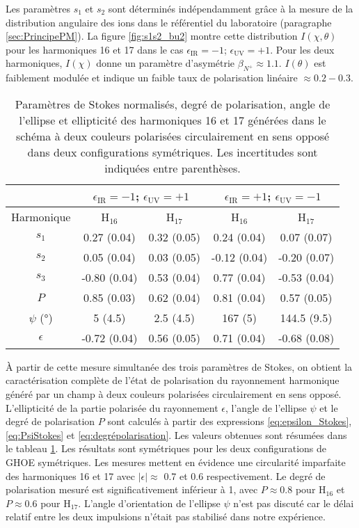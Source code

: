 Les paramètres $s_1$ et $s_2$ sont déterminés indépendamment grâce à la mesure de la distribution angulaire des ions dans le référentiel du laboratoire (paragraphe \ref{sec:PrincipePM}). La figure \ref{fig:s1s2_bu2} montre cette distribution $I(\chi, \theta)$ pour les harmoniques 16 et 17 dans le cas $\epsilon_{\text{IR}} = -1$; $\epsilon_{\text{UV}} = +1$. Pour les deux harmoniques, $I(\chi)$ donne un paramètre d'asymétrie $\beta_{N^+} \approx 1.1$. $I(\theta)$ est faiblement modulée et indique un faible taux de polarisation linéaire $\approx 0.2 -0.3$.

\begin{table}[ht]
\centering
\begin{tabular}{|c||c|c|c|c|}
\hline
 & \multicolumn{2}{c|}{$\epsilon_{\text{IR}} = -1$; $\epsilon_{\text{UV}} = +1$} &  \multicolumn{2}{c|}{$\epsilon_{\text{IR}} = +1$; $\epsilon_{\text{UV}} = -1$} \\
\hline
Harmonique & H$_{16}$ & H$_{17}$ & H$_{16}$ & H$_{17}$ \\
\hline
$s_1$ & 0.27 (0.04) & 0.32 (0.05) & 0.24 (0.04) & 0.07 (0.07) \\
\hline
$s_2$ & 0.05 (0.04) & 0.03 (0.05) & -0.12 (0.04) & -0.20 (0.07) \\
\hline
$s_3$ & -0.80 (0.04) & 0.53 (0.04) & 0.77 (0.04) & -0.53 (0.04) \\
\hline
$P$ & 0.85 (0.03) & 0.62 (0.04) & 0.81 (0.04) & 0.57 (0.05) \\
\hline
$\psi$ (°) & 5 (4.5) & 2.5 (4.5) & 167 (5) & 144.5 (9.5) \\
\hline
$\epsilon$ & -0.72 (0.04) & 0.56 (0.05) & 0.71 (0.04) & -0.68 (0.08) \\
\hline
\end{tabular}
\caption{Paramètres de Stokes normalisés, degré de polarisation, angle de l'ellipse et ellipticité des harmoniques 16 et 17 générées dans le schéma à deux couleurs polarisées circulairement en sens opposé dans deux configurations symétriques. Les incertitudes sont indiquées entre parenthèses.}
\label{tab:resultatspm1}
\end{table}

\`{A} partir de cette mesure simultanée des trois paramètres de Stokes, on obtient la caractérisation complète de l'état de polarisation du rayonnement harmonique généré par un champ à deux couleurs polarisées circulairement en sens opposé. L'ellipticité de la partie polarisée du rayonnement $\epsilon$, l'angle de l'ellipse $\psi$ et le degré de polarisation $P$ sont calculés à partir des expressions \ref{eq:epsilon_Stokes}, \ref{eq:PsiStokes} et \ref{eq:degrépolarisation}. Les valeurs obtenues sont résumées dans le tableau \ref{tab:resultatspm1}. Les résultats sont symétriques pour les deux configurations de GHOE symétriques. Les mesures mettent en évidence une circularité imparfaite des harmoniques 16 et 17 avec $|\epsilon| \approx$ 0.7 et 0.6 respectivement. Le degré de polarisation mesuré est significativement inférieur à 1, avec $P \approx 0.8$ pour H$_{16}$ et $P \approx 0.6$ pour H$_{17}$. L'angle d'orientation de l'ellipse $\psi$ n'est pas discuté car le délai relatif entre les deux impulsions n'était pas stabilisé dans notre expérience.

